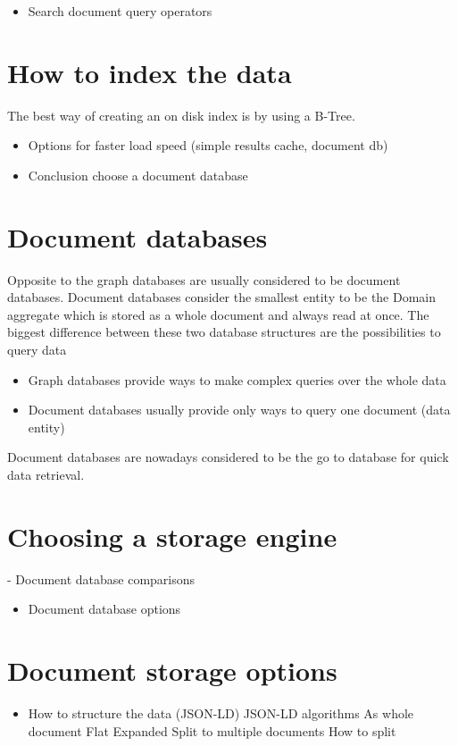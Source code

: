 \begin{itemize}
	\item Search document query operators
\end{itemize}

\section{How to index the data} %

The best way of creating an on disk index is by using a B-Tree.
\begin{itemize}
	\item Options for faster load speed (simple results cache, document db)
	\item Conclusion choose a document database
\end{itemize}

\section{Document databases}
Opposite to the graph databases are usually considered to be document databases. Document databases consider the smallest entity to be the Domain aggregate which is stored as a whole document and always read at once. The biggest difference between these two database structures are the possibilities to query data
\begin{itemize}
	\item Graph databases provide ways to make complex queries over the whole data
	\item Document databases usually provide only ways to query one document (data entity)
\end{itemize}
Document databases are nowadays considered to be the go to database for quick data retrieval.




\section{Choosing a storage engine}
- Document database comparisons
\begin{itemize}
	\item Document database options
\end{itemize}

\section{Document storage options}
\begin{itemize}
	\item How to structure the data (JSON-LD)
		\subitem JSON-LD algorithms
		\subitem As whole document
			\subsubitem Flat
			\subsubitem Expanded
		\subitem Split to multiple documents
			\subsubitem How to split
\end{itemize}

